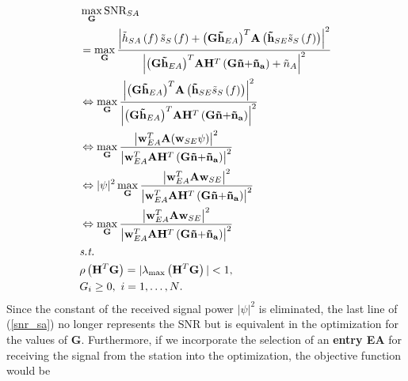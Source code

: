 \begin{align}
\label{snr_sa}
& \max_\mathbf{G} \text{SNR}_{SA} \notag \\
& = \max_\mathbf{G} \frac{{{{\left| {{{\tilde h}_{SA}}\left( f \right){{{\tilde s}_{S}}\left( f \right)} + {{\left( {\mathbf{G}{{\mathbf{\tilde h}}_{EA}}} \right)}^T}\mathbf{A} \left({{\mathbf{\tilde h}}_{SE}}{{{\tilde s}_{S}}\left( f \right)}\right)} \right|}^2}}}{{{{\left| {{{\left( {\mathbf{G}{{\mathbf{\tilde h}}_{EA}}} \right)}^T}\mathbf{A}{\mathbf{H}^T}\left( {\mathbf{G\tilde n + }{{\mathbf{\tilde n}}_\mathbf{a}}} \right) + {{\tilde n}_{A}}} \right|}^2}}} \notag \\
& \Leftrightarrow \max_\mathbf{G}
\frac{{{{\left|{{\left( {\mathbf{G}{{\mathbf{\tilde h}}_{EA}}} \right)}^T}\mathbf{A} \left({{\mathbf{\tilde h}}_{SE}}{{{\tilde s}_{S}}\left( f \right)}\right) \right|}^2}}}{{{{\left| {{{\left( {\mathbf{G}{{\mathbf{\tilde h}}_{EA}}} \right)}^T}\mathbf{A}{\mathbf{H}^T}\left( {\mathbf{G\tilde n + }{{\mathbf{\tilde n}}_\mathbf{a}}} \right)} \right|}^2}}} \notag \\
&\Leftrightarrow
\max_\mathbf{G} 
\frac{{{{\left|\mathbf{w}_{EA}^T\mathbf{A}{\left(\mathbf{w}_{SE} \psi\right)} \right|}^2}}}{{{{\left| {\mathbf{w}_{EA}^T\mathbf{A}{\mathbf{H}^T}\left( {\mathbf{G\tilde n + }{{\mathbf{\tilde n}}_\mathbf{a}}} \right)} \right|}^2}}} \notag \\
&\Leftrightarrow
|\psi|^2 \max_\mathbf{G} 
\frac{{{{\left|\mathbf{w}_{EA}^T\mathbf{A}{\mathbf{w}_{SE}} \right|}^2}}}{{{{\left| {\mathbf{w}_{EA}^T\mathbf{A}{\mathbf{H}^T}\left( {\mathbf{G\tilde n + }{{\mathbf{\tilde n}}_\mathbf{a}}} \right)}\right|}^2}}} \notag \\ 
&\Leftrightarrow \max_\mathbf{G} 
\frac{{{{\left|\mathbf{w}_{EA}^T\mathbf{A}{\mathbf{w}_{SE}} \right|}^2}}}{{{{\left| {\mathbf{w}_{EA}^T\mathbf{A}{\mathbf{H}^T}\left( {\mathbf{G\tilde n + }{{\mathbf{\tilde n}}_\mathbf{a}}} \right)} \right|}^2}}} \\
&\textit{s.t.} \notag \\
& \rho\left({\mathbf{H}^T}\mathbf{G}\right)=|\lambda_{\max}\left({\mathbf{H}^T}\mathbf{G}\right)|<1, \notag\\
& G_i\geq0,{\ }i=1,\dots, N \text{.} \notag
\end{align}
Since the constant of the received signal power $|\psi|^2$ is eliminated, the last line of (\ref{snr_sa}) no longer represents the SNR but is equivalent in the optimization for the values of $\mathbf{G}$. Furthermore, if we incorporate the selection of an \textbf{entry EA} for receiving the signal from the station into the optimization, the objective function would be
